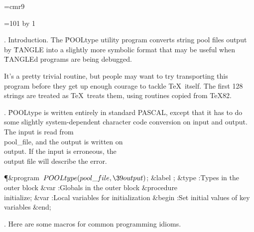 

\def\hang{\hangindent 3em\indent\ignorespaces}
\font\ninerm=cmr9
\let\mc=\ninerm %
\def\PASCAL{{\mc PASCAL}}

\def\(#1){} %
\def\9#1{} %

\def\title{POOL\lowercase{type}}
\def\contentspagenumber{101}
\def\topofcontents{\null
  \def\titlepage{F} %
  \def\rheader{\mainfont\hfil \contentspagenumber}
  \vfill
  \centerline{\titlefont The {\ttitlefont POOLtype} processor}
  \vskip 15pt
  \centerline{(Version 1, June 1982)}
  \vfill}
\def\botofcontents{\vfill
  \centerline{\hsize 5in\baselineskip9pt
    \vbox{\ninerm\noindent
    The preparation of this report
    was supported in part by the National Science
    Foundation under grants IST-8201926 and MCS-7723738,
    and by the System Development Foundation. `\TeX' is a
    trademark of the American Mathematical Society.}}}
=\contentspagenumber {} by 1


.  Introduction.
The \.{POOLtype} utility program converts string pool files output
by \.{TANGLE} into a slightly more symbolic format that may be useful
when \.{TANGLE}d programs are being debugged.

It's a pretty trivial routine, but people may want to try transporting
this program before they get up enough courage to tackle \TeX\ itself.
The first 128 strings are treated as \TeX\ treats them, using routines
copied from \TeX82.

\fi
{}. \.{POOLtype} is written entirely in standard \PASCAL, except that it has
to do some slightly system-dependent character code conversion on input
and output. The input is read from \\{pool\_file}, and the output is written
on \\{output}. If the input is erroneous, the \\{output} file will describe
the error.

\Y\P\4\&{program}\1\  $\\{POOLtype}(\\{pool\_file},\39\\{output})$;\6
\4\&{label} ;\6
\4\&{type} :Types in the outer block\X\6
\4\&{var} :Globals in the outer block\X\6
\4\&{procedure}\1\  \\{initialize};\6
\4\&{var} :Local variables for initialization\X\2\6
\&{begin} :Set initial values of key variables\X\6
\&{end};\par
\fi
{}. Here are some macros for common programming idioms.

